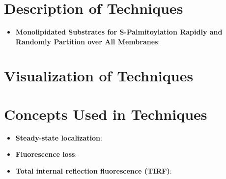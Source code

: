 \documentclass[basic,plain]{inVerba-notes}
\begin{document}
\section{Description of Techniques}
\begin{itemize}
  \item \textbf{Monolipidated Substrates for S-Palmitoylation Rapidly and Randomly Partition over All Membranes}:
\end{itemize}

\section{Visualization of Techniques}
\begin{center}

  \medskip

\end{center}

\section{Concepts Used in Techniques}
\begin{itemize}
  \item \textbf{Steady-state localization}:
  \item \textbf{Fluorescence loss}:
  \item \textbf{Total internal reflection fluorescence (TIRF)}:
\end{itemize}
\end{document}
